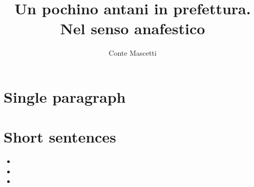 \documentclass[12pt,a4paper]{article}
\title{Un pochino antani in prefettura. \\ Nel senso anafestico}
\author{Conte Mascetti}
\date{\DTMusedate{data}}
\begin{document}
\maketitle
\section*{Single paragraph}
\antani[88]
\section*{Short sentences}
\begin{itemize}
 \item \antani[19][2]
 \item \antani[5][3]
 \item \antani[2][5]
\end{itemize}

\end{document}
